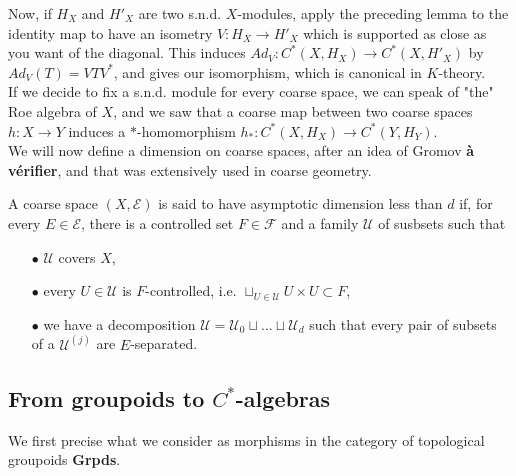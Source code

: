 Now, if $H_X$ and $H'_X$ are two s.n.d. $X$-modules, apply the preceding lemma to the identity map to have an isometry $V: H_X\rightarrow H'_X$ which is supported as close as you want of the diagonal. This induces $Ad_V : C^*(X,H_X)\rightarrow C^*(X,H'_X)$ by $Ad_V(T) = VTV^*$, and gives our isomorphism, which is canonical in $K$-theory. \\

If we decide to fix a s.n.d. module for every coarse space, we can speak of "the" Roe algebra of $X$, and we saw that a coarse map between two coarse spaces $h : X\rightarrow Y$ induces a $*$-homomorphism $h_* : C^*(X,H_X)\rightarrow C^*(Y,H_Y)$. \\

We will now define a dimension on coarse spaces, after an idea of Gromov \textbf{à vérifier}, and that was extensively used in coarse geometry.\\

\begin{definition}
A coarse space $(X,\mathcal E)$ is said to have asymptotic dimension less than $d$ if, for every $E\in \mathcal E$, there is a controlled set $F\in\mathcal F$ and a family $\mathcal U$ of susbsets such that 
\begin{itemize}
\item[$\bullet$] $\mathcal U$ covers $X$,
\item[$\bullet$] every $U\in \mathcal U$ is $F$-controlled, i.e. $\sqcup_{U \in \mathcal U} U\times U \subset F$,
\item[$\bullet$] we have a decomposition $\mathcal U = \mathcal U_0 \sqcup ... \sqcup \mathcal U_d$ such that every pair of subsets of a $\mathcal U^{(j)}$ are $E$-separated.
\end{itemize}
\end{definition}

\subsection{From groupoids to $C^*$-algebras}

We first precise what we consider as morphisms in the category of topological groupoids \textbf{Grpds}.\\

